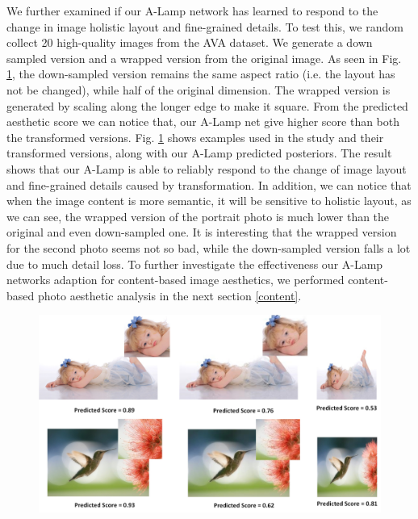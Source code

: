 \documentclass[10pt,twocolumn,letterpaper]{article}
\begin{document}
We further examined if our A-Lamp network has learned to respond to the change in image holistic layout and fine-grained details. To test this, we random collect 20 high-quality images from the AVA dataset. We generate a down sampled version and a wrapped version from the original image. As seen in Fig. \ref*{trans_img}, the down-sampled version remains the same aspect ratio (i.e. the layout has not be changed), while half of the original dimension. The wrapped version is generated by scaling along the longer edge to make it square. From the predicted aesthetic score we can notice that, our A-Lamp net give higher score than both the transformed versions. 
Fig. \ref*{trans_img} shows examples used in the study and their transformed versions, along with our A-Lamp predicted posteriors. The result shows that our A-Lamp is able to reliably respond to the change of image layout and fine-grained details caused by transformation. In addition, we can notice that when the image content is more semantic, it will be sensitive to holistic layout, as we can see, the wrapped version of the portrait photo is much lower than the original and even down-sampled one. It is interesting that the wrapped version for the second photo seems not so bad, while the down-sampled version falls a lot due to much detail loss. To further investigate the effectiveness our A-Lamp networks adaption for content-based image aesthetics, we performed content-based photo aesthetic analysis in the next section \ref{content}.


\begin{figure}
	\centering
	\includegraphics[scale=0.2]{figures/expr_transform.jpg}
	\label{trans_img}
\end{figure}

\end{document}
